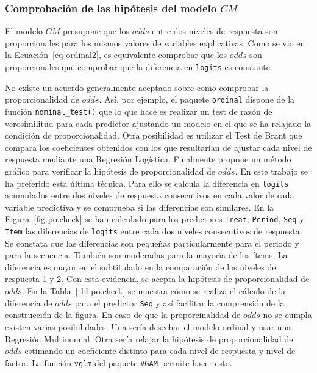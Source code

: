 \documentclass[
  12pt,
  a4paper,
  extrafontsizes,
  onecolumn,
  openright,
  table]{memoir}
\begin{document}
\hypertarget{comprobaciuxf3n-de-las-hipuxf3tesis-del-modelo-cm}{%
\subsubsection{\texorpdfstring{Comprobación de las hipótesis del modelo
\(CM\)}{Comprobación de las hipótesis del modelo CM}}\label{comprobaciuxf3n-de-las-hipuxf3tesis-del-modelo-cm}}

El modelo \(CM\) presupone que los \(odds\) entre dos niveles de
respuesta son proporcionales para los mismos valores de variables
explicativas. Como se vio en la Ecuación~\ref{eq-ordinal2}, es
equivalente comprobar que los \(odds\) son proporcionales que comprobar
que la diferencia en \texttt{logits} es constante.

No existe un acuerdo generalmente aceptado sobre como comprobar la
proporcionalidad de \(odds\). Así, por ejemplo, el paquete
\texttt{ordinal} \autocite[ver][]{ordinalR} dispone de la función
\texttt{nominal\_test()} que lo que hace es realizar un test de razón de
verosimilitud para cada predictor ajustando un modelo en el que se ha
relajado la condición de proporcionalidad. Otra posibilidad es utilizar
el Test de Brant \autocite[ver][]{brant1990} que compara los
coeficientes obtenidos con los que resultarían de ajustar cada nivel de
respuesta mediante una Regresión Logística. Finalmente \textcite[ver
pp.~315-316]{harrell2015} propone un método gráfico para verificar la
hipótesis de proporcionalidad de \(odds\). En este trabajo se ha
preferido esta última técnica. Para ello se calcula la diferencia en
\texttt{logits} acumulados entre dos niveles de respuesta consecutivos
en cada valor de cada variable predictiva y se comprueba si las
diferencias son similares. En la Figura~\ref{fig-po.check} se han
calculado para los predictores \texttt{Treat}, \texttt{Period},
\texttt{Seq} y \texttt{Item} las diferencias de \texttt{logits} entre
cada dos niveles consecutivos de respuesta. Se constata que las
diferencias son pequeñas particularmente para el periodo y para la
secuencia. También son moderadas para la mayoría de los ítems. La
diferencia es mayor en el subtitulado en la comparación de los niveles
de respuesta 1 y 2. Con esta evidencia, se acepta la hipótesis de
proporcionalidad de \(odds\). En la Tabla~\ref{tbl-po.check} se muestra
cómo se realiza el cálculo de la diferencia de \(odds\) para el
predictor \texttt{Seq} y así facilitar la comprensión de la construcción
de la figura. En caso de que la proporcinalidad de \(odds\) no se cumpla
existen varias posibilidades. Una sería desechar el modelo ordinal y
usar una Regresión Multinomial. Otra sería relajar la hipótesis de
proporcionalidad de \(odds\) estimando un coeficiente distinto para cada
nivel de respuesta y nivel de factor. La función \texttt{vglm} del
paquete \texttt{VGAM} \autocite[ver][]{VGAMR} permite hacer esto.
\end{document}
